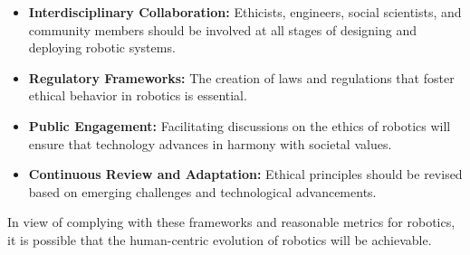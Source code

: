\begin{itemize}
    \item \textbf{Interdisciplinary Collaboration:} Ethicists, engineers, social scientists, and community members should be involved at all stages of designing and deploying robotic systems.
    
    \item \textbf{Regulatory Frameworks:} The creation of laws and regulations that foster ethical behavior in robotics is essential.
    
    \item \textbf{Public Engagement:} Facilitating discussions on the ethics of robotics will ensure that technology advances in harmony with societal values.
    
    \item \textbf{Continuous Review and Adaptation:} Ethical principles should be revised based on emerging challenges and technological advancements.
\end{itemize}

In view of complying with these frameworks and reasonable metrics for robotics, it is possible that the human-centric evolution of robotics will be achievable.\cite{article}
